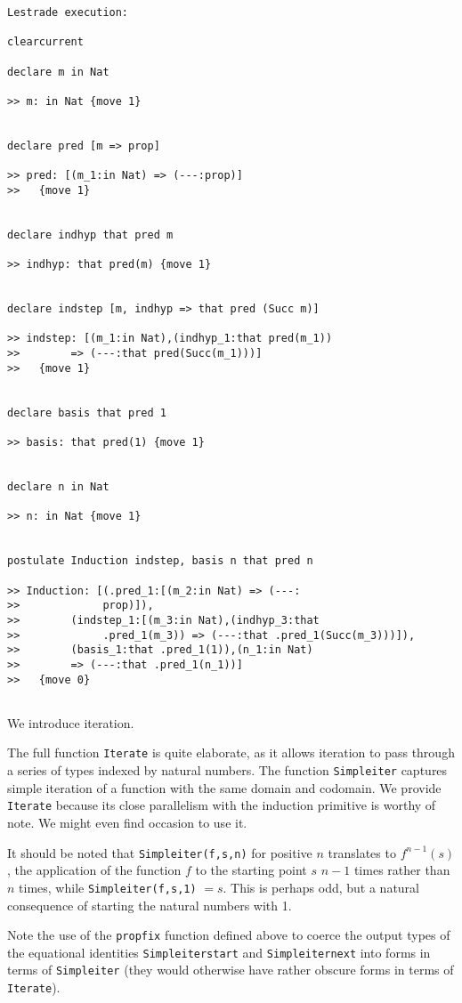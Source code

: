 \documentclass[12pt]{article}
\begin{document}
\begin{verbatim}Lestrade execution:

clearcurrent

declare m in Nat

>> m: in Nat {move 1}


declare pred [m => prop]

>> pred: [(m_1:in Nat) => (---:prop)]
>>   {move 1}


declare indhyp that pred m

>> indhyp: that pred(m) {move 1}


declare indstep [m, indhyp => that pred (Succ m)]

>> indstep: [(m_1:in Nat),(indhyp_1:that pred(m_1)) 
>>        => (---:that pred(Succ(m_1)))]
>>   {move 1}


declare basis that pred 1

>> basis: that pred(1) {move 1}


declare n in Nat

>> n: in Nat {move 1}


postulate Induction indstep, basis n that pred n

>> Induction: [(.pred_1:[(m_2:in Nat) => (---:
>>             prop)]),
>>        (indstep_1:[(m_3:in Nat),(indhyp_3:that 
>>             .pred_1(m_3)) => (---:that .pred_1(Succ(m_3)))]),
>>        (basis_1:that .pred_1(1)),(n_1:in Nat) 
>>        => (---:that .pred_1(n_1))]
>>   {move 0}


\end{verbatim}

We introduce iteration.  

The full function {\tt Iterate} is quite elaborate, as it allows iteration to pass through a series of types indexed by natural numbers.  The function
{\tt Simpleiter} captures simple iteration of a function with the same domain and codomain.  We provide {\tt Iterate} because its close parallelism with
the induction primitive is worthy of note.  We might even find occasion to use it.

It should be noted that {\tt Simpleiter(f,s,n)} for positive $n$ translates to $f^{n-1}(s)$, the application of the function $f$
to the starting point $s$ $n-1$ times rather than $n$ times, while {\tt Simpleiter(f,s,1)} $= s$.  This is perhaps odd, but a natural consequence of starting the natural numbers with 1.

Note the use of the {\tt propfix} function defined above to coerce the output types of the equational identities {\tt Simpleiterstart} and
{\tt Simpleiternext} into forms in terms of {\tt Simpleiter} (they would otherwise have rather obscure forms in terms of {\tt Iterate}).
\end{document}
